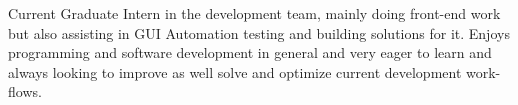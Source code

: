 

\begin{cvparagraph}

Current Graduate Intern in the development team, mainly doing front-end work but also assisting in GUI Automation testing and building solutions for it. Enjoys programming and software development in general and very eager to learn and always looking to improve as well solve and optimize current development work-flows.
\end{cvparagraph}
